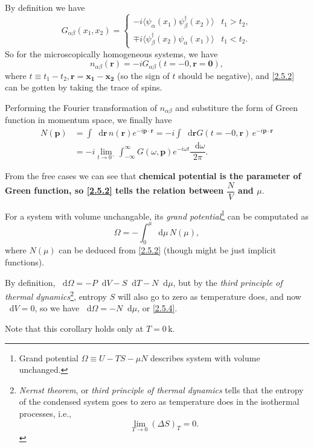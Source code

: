 \documentclass[b5paper,10pt,UTF8]{book}
\newcommand*\dd{\mathop{}\!\mathrm{d}}
\numberwithin{equation}{section}
\begin{document}
		\begin{Proof}
			By definition we have
			\begin{equation*}
				G_{\alpha\beta}(x_1,x_2)=\begin{cases}-i\langle\psi_\alpha(x_1)\psi_\beta^\dagger(x_2)\rangle&t_1>t_2,\\
				\mp i\langle\psi_\beta^\dagger(x_2)\psi_\alpha(x_1)\rangle&t_1<t_2.\end{cases}
			\end{equation*}
			So for the microscopically homogeneous systems, we have
			$$n_{\alpha\beta}(\bm{r})=-iG_{\alpha\beta}(t=-0,\bm{r}=\bm{0}),$$
			where $t\equiv t_1-t_2, \bm{r}=\bm{x_1}-\bm{x_2}$ (so the sign of $t$ should be negative), and \eqref{2.5.2} can be gotten by taking the trace of spins.\par
			Performing the Fourier transformation of $n_{\alpha\beta}$ and substiture the form of Green function in momentum space, we finally have
			\begin{align*}
				N(\bm{p})&=\int\dd\bm{r}\,n(\bm{r})e^{-i\bm{p\cdot r}}=-i\int\dd\bm{r} G(t=-0,\bm{r})\,e^{-i\bm{p\cdot r}}\\
				&=-i\lim_{t\rightarrow0^-}\int_{-\infty}^{\infty}G(\omega,\bm{p})e^{-i\omega t}\dfrac{\dd \omega}{2\pi}.
			\end{align*}
		\end{Proof}
		\begin{Note}
			From the free cases we can see that \textbf{chemical potential is the parameter of Green function, so \eqref{2.5.2} tells the relation between $\dfrac{N}{V}$ and $\mu$}.
		\end{Note}
		\begin{Corollary}
			For a system with volume unchangable, its \emph{grand potential}\footnote{Grand potential $\Omega\equiv U-TS-\mu N$ describes system with volume unchanged.} can be computated as
			\begin{equation}\label{2.5.4}
				\Omega=-\int_0^\mu\dd \mu\, N(\mu),
			\end{equation}
			where $N(\mu)$ can be deduced from \eqref{2.5.2} (though might be just implicit functions).
		\end{Corollary}
		\begin{Proof}
			By definition, $\dd\Omega=-P\dd V-S\dd T-N\dd\mu$, but by the \emph{third principle of thermal dynamics}\footnote{\emph{Nernst theorem}, or \emph{third principle of thermal dynamics} tells that the entropy of the condensed system goes to zero as temperature does in the isothermal processes, i.e.,$$\lim_{T\rightarrow 0}(\Delta S)_T=0.$$}, entropy $S$ will also go to zero as temperature does, and now $\dd V=0$, so we have $\dd\Omega=-N\dd\mu$, or \eqref{2.5.4}.
		\end{Proof}
		\begin{Note}
			Note that this corollary holds only at $T=0\,\mathrm{k}$.
		\end{Note}
\end{document}
